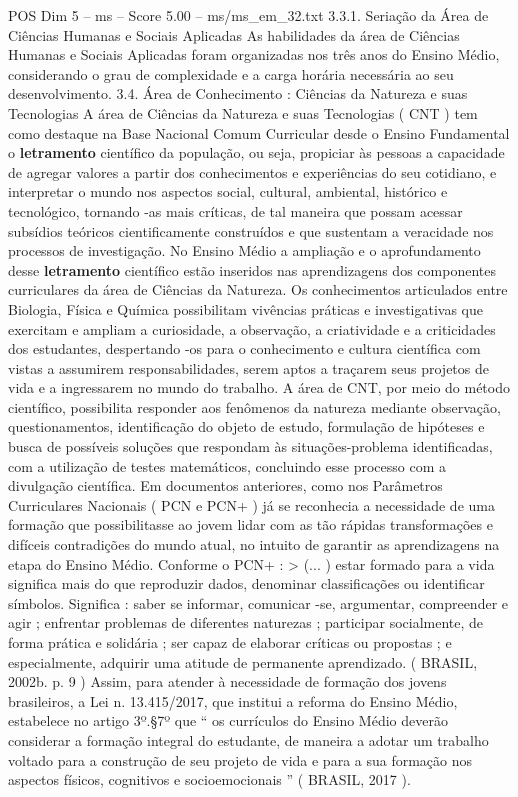 \begin{textsample}{POS Dim 5 – ms – Score 5.00 – ms/ms\_em\_32.txt}  \label{ex:f5_pos_216}
3.3.1.
Seriação da Área de Ciências Humanas e Sociais Aplicadas As habilidades da área de Ciências Humanas e Sociais Aplicadas foram organizadas nos três anos do Ensino Médio, considerando o grau de complexidade e a carga horária necessária ao seu desenvolvimento. 3.4.
Área de Conhecimento : Ciências da Natureza e suas Tecnologias A área de Ciências da Natureza e suas Tecnologias ( CNT ) tem como destaque na Base Nacional Comum Curricular desde o Ensino Fundamental o \textbf{letramento} científico da população, ou seja, propiciar às pessoas a capacidade de agregar valores a partir dos conhecimentos e experiências do seu cotidiano, e interpretar o mundo nos aspectos social, cultural, ambiental, histórico e tecnológico, tornando -as mais críticas, de tal maneira que possam acessar subsídios teóricos cientificamente construídos e que sustentam a veracidade nos processos de investigação.
No Ensino Médio a ampliação e o aprofundamento desse \textbf{letramento} científico estão inseridos nas aprendizagens dos componentes curriculares da área de Ciências da Natureza.
Os conhecimentos articulados entre Biologia, Física e Química possibilitam vivências práticas e investigativas que exercitam e ampliam a curiosidade, a observação, a criatividade e a criticidades dos estudantes, despertando -os para o conhecimento e cultura científica com vistas a assumirem responsabilidades, serem aptos a traçarem seus projetos de vida e a ingressarem no mundo do trabalho.
A área de CNT, por meio do método científico, possibilita responder aos fenômenos da natureza mediante observação, questionamentos, identificação do objeto de estudo, formulação de hipóteses e busca de possíveis soluções que respondam às situações-problema identificadas, com a utilização de testes matemáticos, concluindo esse processo com a divulgação científica.
Em documentos anteriores, como nos Parâmetros Curriculares Nacionais ( PCN e PCN+ ) já se reconhecia a necessidade de uma formação que possibilitasse ao jovem lidar com as tão rápidas transformações e difíceis contradições do mundo atual, no intuito de garantir as aprendizagens na etapa do Ensino Médio.
Conforme o PCN+ : > (... ) estar formado para a vida significa mais do que reproduzir dados, denominar classificações ou identificar símbolos.
Significa : saber se informar, comunicar -se, argumentar, compreender e agir ; enfrentar problemas de diferentes naturezas ; participar socialmente, de forma prática e solidária ; ser capaz de elaborar críticas ou propostas ; e especialmente, adquirir uma atitude de permanente aprendizado. ( BRASIL, 2002b. p. 9 ) Assim, para atender à necessidade de formação dos jovens brasileiros, a Lei n. 13.415/2017, que institui a reforma do Ensino Médio, estabelece no artigo 3º.§7º que “ os currículos do Ensino Médio deverão considerar a formação integral do estudante, de maneira a adotar um trabalho voltado para a construção de seu projeto de vida e para a sua formação nos aspectos físicos, cognitivos e socioemocionais ” ( BRASIL, 2017 ).

\end{textsample}

